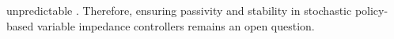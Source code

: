 unpredictable \cite{schulmanProximalPolicyOptimization2017,schulmanTrustRegionPolicy2017,haarnojaSoftActorCriticOffPolicy2018,hanLyapunovActorCriticReinforcement2019,liActorcriticLearningFramework2023,wuDeepReinforcementLearning2023}. Therefore, ensuring passivity and stability in stochastic policy-based variable impedance controllers remains an open question.
